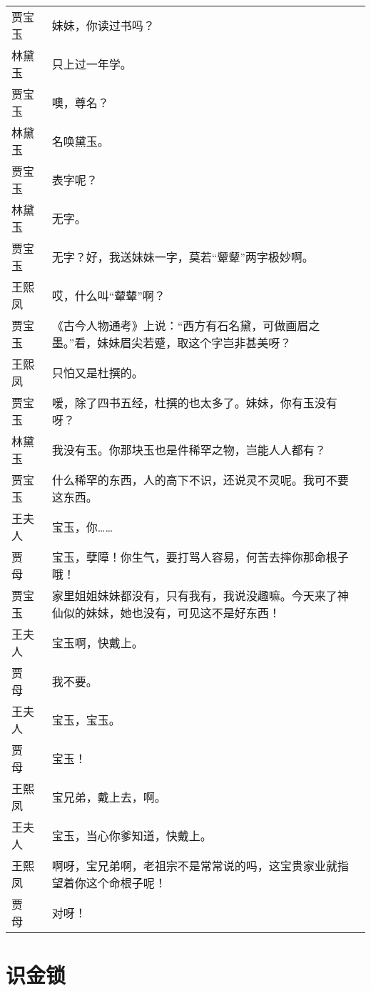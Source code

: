 \documentclass{article}
\newenvironment{lpar}{\vspace{-1ex}\begin{longtable}{lp{0.85\columnwidth}}}{\end{longtable}}
\newcommand\lver[2]{\vspace{1ex}#1&#2\\}
\begin{document}
\begin{lpar}
\lver{贾宝玉}{妹妹，你读过书吗？}
\lver{林黛玉}{只上过一年学。}
\lver{贾宝玉}{噢，尊名？}
\lver{林黛玉}{名唤黛玉。}
\lver{贾宝玉}{表字呢？}
\lver{林黛玉}{无字。}
\lver{贾宝玉}{无字？好，我送妹妹一字，莫若“颦颦”两字极妙啊。}
\lver{王熙凤}{哎，什么叫“颦颦”啊？}
\lver{贾宝玉}{《古今人物通考》上说：“西方有石名黛，可做画眉之墨。”看，妹妹眉尖若蹙，取这个字岂非甚美呀？}
\lver{王熙凤}{只怕又是杜撰的。}
\lver{贾宝玉}{嗳，除了四书五经，杜撰的也太多了。妹妹，你有玉没有呀？}
\lver{林黛玉}{我没有玉。你那块玉也是件稀罕之物，岂能人人都有？}
\lver{贾宝玉}{什么稀罕的东西，人的高下不识，还说灵不灵呢。我可不要这东西。}
\lver{王夫人}{宝玉，你……}
\lver{贾　母}{宝玉，孽障！你生气，要打骂人容易，何苦去摔你那命根子哦！}
\lver{贾宝玉}{家里姐姐妹妹都没有，只有我有，我说没趣嘛。今天来了神仙似的妹妹，她也没有，可见这不是好东西！}
\lver{王夫人}{宝玉啊，快戴上。}
\lver{贾　母}{我不要。}
\lver{王夫人}{宝玉，宝玉。}
\lver{贾　母}{宝玉！}
\lver{王熙凤}{宝兄弟，戴上去，啊。}
\lver{王夫人}{宝玉，当心你爹知道，快戴上。}
\lver{王熙凤}{啊呀，宝兄弟啊，老祖宗不是常常说的吗，这宝贵家业就指望着你这个命根子呢！}
\lver{贾　母}{对呀！}
\end{lpar}

\section{识金锁}
\end{document}
